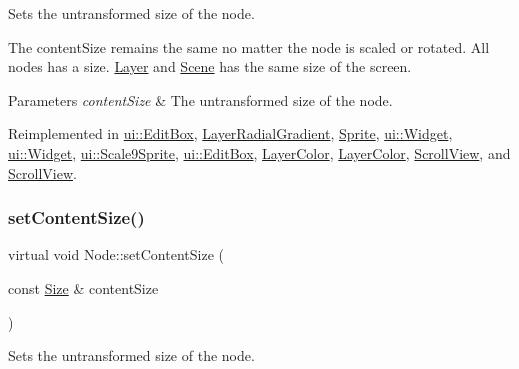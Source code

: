 Sets the untransformed size of the node.

The content\+Size remains the same no matter the node is scaled or rotated. All nodes has a size. \hyperlink{classLayer}{Layer} and \hyperlink{classScene}{Scene} has the same size of the screen.


\begin{DoxyParams}{Parameters}
{\em content\+Size} & The untransformed size of the node. \\
\hline
\end{DoxyParams}


Reimplemented in \hyperlink{classui_1_1EditBox_a3fbf590dff29ba873d9c72af308f7edd}{ui\+::\+Edit\+Box}, \hyperlink{classLayerRadialGradient_ad8edf7d6ace4a1cf07966fd63c942c4b}{Layer\+Radial\+Gradient}, \hyperlink{classSprite_a040ac797e7c5a3a7ffee7acee8904629}{Sprite}, \hyperlink{classui_1_1Widget_af5f35184ff3de275929e937f81a4ae30}{ui\+::\+Widget}, \hyperlink{classui_1_1Widget_af5f35184ff3de275929e937f81a4ae30}{ui\+::\+Widget}, \hyperlink{classui_1_1Scale9Sprite_af7a55ebc4ba4b0da9ce2ce34bb3bda37}{ui\+::\+Scale9\+Sprite}, \hyperlink{classui_1_1EditBox_a1aadf938d146d0469da42e42d33e2a1e}{ui\+::\+Edit\+Box}, \hyperlink{classLayerColor_a3db3f4ffab871cc95a3dca8476c22251}{Layer\+Color}, \hyperlink{classLayerColor_a066da112c29c206c4638f84b5d3a9f37}{Layer\+Color}, \hyperlink{classScrollView_a9d52bf1ed3831200285167c35fafa686}{Scroll\+View}, and \hyperlink{classScrollView_a3cf1d7fd072898e64498a7dc9c5932c1}{Scroll\+View}.

\mbox{\label{classNode_af2cee4ec181c4f879e14e32c7c4b96ca}} 
\subsubsection{\texorpdfstring{set\+Content\+Size()}{setContentSize()}\hspace{0.1cm}{\footnotesize\ttfamily [2/2]}}
{\footnotesize\ttfamily virtual void Node\+::set\+Content\+Size (\begin{DoxyParamCaption}\item[{const \hyperlink{classSize}{Size} \&}]{content\+Size }\end{DoxyParamCaption})\hspace{0.3cm}{\ttfamily [virtual]}}

Sets the untransformed size of the node.

